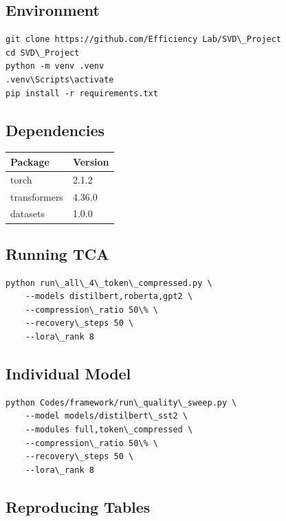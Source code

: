 \subsection{Environment}

\begin{lstlisting}
git clone https://github.com/Efficiency Lab/SVD\_Project
cd SVD\_Project
python -m venv .venv
.venv\Scripts\activate
pip install -r requirements.txt
\end{lstlisting}

\subsection{Dependencies}

\begin{table}[H]
\centering
\small
\begin{tabular}{ll}
\toprule
\textbf{Package} & \textbf{Version} \\
\midrule
torch & 2.1.2 \\
transformers & 4.36.0 \\
datasets & 1.0.0 \\
\bottomrule
\end{tabular}
\end{table}

\subsection{Running TCA}

\begin{lstlisting}
python run\_all\_4\_token\_compressed.py \
    --models distilbert,roberta,gpt2 \
    --compression\_ratio 50\% \
    --recovery\_steps 50 \
    --lora\_rank 8
\end{lstlisting}

\subsection{Individual Model}

\begin{lstlisting}
python Codes/framework/run\_quality\_sweep.py \
    --model models/distilbert\_sst2 \
    --modules full,token\_compressed \
    --compression\_ratio 50\% \
    --recovery\_steps 50 \
    --lora\_rank 8
\end{lstlisting}

\subsection{Reproducing Tables}

